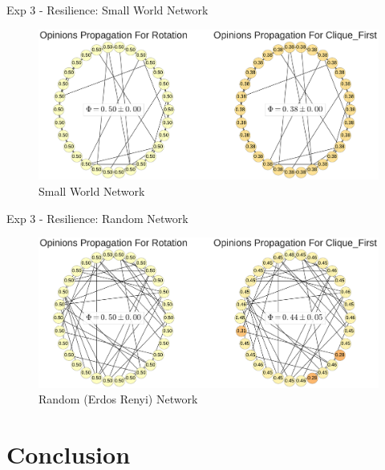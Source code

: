 \begin{frame}{Exp 3 - Resilience: Small World Network}

\begin{figure}[htbp]
\centering
\includegraphics{pics/voices_exp3_small_world.pdf}
\caption{Small World Network}
\end{figure}

\end{frame}

\begin{frame}{Exp 3 - Resilience: Random Network}

\begin{figure}[htbp]
\centering
\includegraphics{pics/voices_exp3_random.pdf}
\caption{Random (Erdos Renyi) Network}
\end{figure}

\end{frame}

\section{Conclusion}\label{conclusion}


